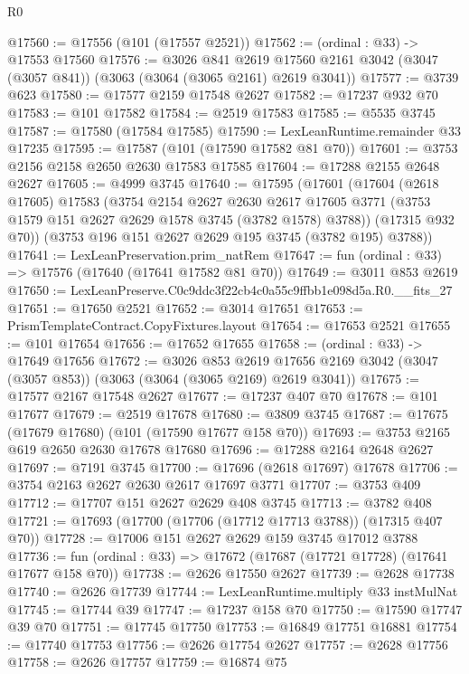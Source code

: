 \begin{lexlean}{R0}
\begin{coremodule}
@17560 := @17556 (@101 (@17557 @2521))
@17562 := (ordinal : @33) -> @17553 @17560
@17576 := @3026
    @841
    @2619
    @17560
    @2161
    @3042
    (@3047 (@3057 @841))
    (@3063 (@3064 (@3065 @2161) @2619 @3041))
@17577 := @3739 @623
@17580 := @17577 @2159 @17548 @2627
@17582 := @17237 @932 @70
@17583 := @101 @17582
@17584 := @2519 @17583
@17585 := @5535 @3745
@17587 := @17580 (@17584 @17585)
@17590 := LexLeanRuntime.remainder @33 @17235
@17595 := @17587 (@101 (@17590 @17582 @81 @70))
@17601 := @3753 @2156 @2158 @2650 @2630 @17583 @17585
@17604 := @17288 @2155 @2648 @2627
@17605 := @4999 @3745
@17640 := @17595
    (@17601
      (@17604
        (@2618 @17605)
        @17583
        (@3754
          @2154
          @2627
          @2630
          @2617
          @17605
          @3771
          (@3753 @1579 @151 @2627 @2629 @1578 @3745 (@3782 @1578) @3788))
        (@17315 @932 @70))
      (@3753 @196 @151 @2627 @2629 @195 @3745 (@3782 @195) @3788))
@17641 := LexLeanPreservation.prim_natRem
@17647 := fun (ordinal : @33) => @17576 (@17640 (@17641 @17582 @81 @70))
@17649 := @3011 @853 @2619
@17650 := LexLeanPreserve.C0c9ddc3f22cb4c0a55c9ffbb1e098d5a.R0.__fits_27
@17651 := @17650 @2521
@17652 := @3014 @17651
@17653 := PrismTemplateContract.CopyFixtures.layout
@17654 := @17653 @2521
@17655 := @101 @17654
@17656 := @17652 @17655
@17658 := (ordinal : @33) -> @17649 @17656
@17672 := @3026
    @853
    @2619
    @17656
    @2169
    @3042
    (@3047 (@3057 @853))
    (@3063 (@3064 (@3065 @2169) @2619 @3041))
@17675 := @17577 @2167 @17548 @2627
@17677 := @17237 @407 @70
@17678 := @101 @17677
@17679 := @2519 @17678
@17680 := @3809 @3745
@17687 := @17675 (@17679 @17680) (@101 (@17590 @17677 @158 @70))
@17693 := @3753 @2165 @619 @2650 @2630 @17678 @17680
@17696 := @17288 @2164 @2648 @2627
@17697 := @7191 @3745
@17700 := @17696 (@2618 @17697) @17678
@17706 := @3754 @2163 @2627 @2630 @2617 @17697 @3771
@17707 := @3753 @409
@17712 := @17707 @151 @2627 @2629 @408 @3745
@17713 := @3782 @408
@17721 := @17693 (@17700 (@17706 (@17712 @17713 @3788)) (@17315 @407 @70))
@17728 := @17006 @151 @2627 @2629 @159 @3745 @17012 @3788
@17736 := fun (ordinal : @33) => @17672 (@17687 (@17721 @17728) (@17641 @17677 @158 @70))
@17738 := @2626 @17550 @2627
@17739 := @2628 @17738
@17740 := @2626 @17739
@17744 := LexLeanRuntime.multiply @33 instMulNat
@17745 := @17744 @39
@17747 := @17237 @158 @70
@17750 := @17590 @17747 @39 @70
@17751 := @17745 @17750
@17753 := @16849 @17751 @16881
@17754 := @17740 @17753
@17756 := @2626 @17754 @2627
@17757 := @2628 @17756
@17758 := @2626 @17757
@17759 := @16874 @75

\end{coremodule}
\end{lexlean}
